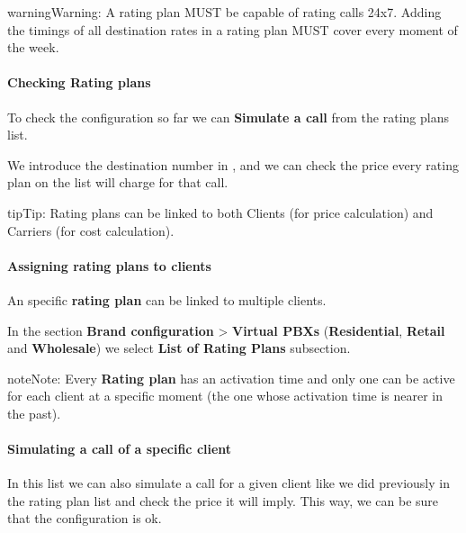 \documentclass[letterpaper,10pt,english]{sphinxmanual}
\begin{document}
\begin{notice}{warning}{Warning:}
A rating plan MUST be capable of rating calls 24x7. Adding the timings of all destination rates in a rating
plan MUST cover every moment of the week.
\end{notice}
\paragraph{Checking Rating plans}

To check the configuration so far we can \textbf{Simulate a call} from the rating plans list.

We introduce the destination number in {\hyperref[administration_portal/brand/settings/numeric_transformations:e164]{}}, and we can check the price every rating plan on the
list will charge for that call.

\begin{notice}{tip}{Tip:}
Rating plans can be linked to both Clients (for price calculation) and Carriers (for cost calculation).
\end{notice}


\paragraph{Assigning rating plans to clients}
\label{administration_portal/brand/billing/rating_plans:id2}\label{administration_portal/brand/billing/rating_plans:assigning-rating-plans-to-clients}
An specific \textbf{rating plan} can be linked to multiple clients.

In the section \textbf{Brand configuration} \textgreater{} \textbf{Virtual PBXs} (\textbf{Residential}, \textbf{Retail} and \textbf{Wholesale}) we select
\textbf{List of Rating Plans} subsection.

\begin{notice}{note}{Note:}
Every \textbf{Rating plan} has an activation time and only one can be active for each
client at a specific moment (the one whose activation time is nearer in the past).
\end{notice}
\paragraph{Simulating a call of a specific client}

In this list we can also simulate a call for a given client like we did previously
in the rating plan list and check the price it will imply. This way, we can be sure
that the configuration is ok.
\end{document}
